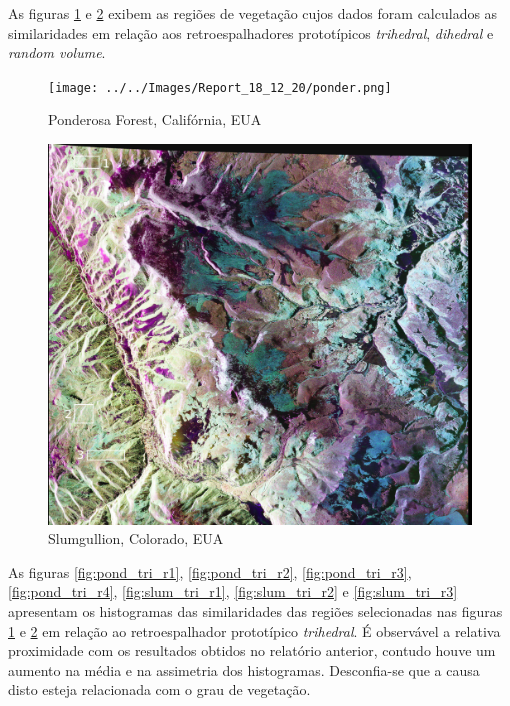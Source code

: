 \documentclass[12pt]{article}
\begin{document}
As figuras \ref{fig:pond} e \ref{fig:slum} exibem as regiões de vegetação cujos dados foram calculados as similaridades em relação aos retroespalhadores prototípicos \textit{trihedral}, \textit{dihedral} e \textit{random volume}.
\newpage

\begin{figure}[!h]
    \centering
    \texttt{[image: ../../Images/Report\_18\_12\_20/ponder.png]}
    \caption{Ponderosa Forest, Califórnia, EUA}
    \label{fig:pond}
\end{figure}

\begin{figure}[!h]
    \centering
    \includegraphics[width = 0.9\linewidth]{../../Images/Report_18_12_20/slum.png}
    \caption{Slumgullion, Colorado, EUA}
    \label{fig:slum}
\end{figure}

As figuras \ref{fig:pond_tri_r1}, \ref{fig:pond_tri_r2}, \ref{fig:pond_tri_r3}, \ref{fig:pond_tri_r4}, \ref{fig:slum_tri_r1}, \ref{fig:slum_tri_r2} e \ref{fig:slum_tri_r3} apresentam os histogramas das similaridades das regiões selecionadas nas figuras \ref{fig:pond} e \ref{fig:slum} em relação ao retroespalhador prototípico \textit{trihedral}. É observável a relativa proximidade com os resultados obtidos no relatório anterior, contudo houve um aumento na média e na assimetria dos histogramas. Desconfia-se que a causa disto esteja relacionada com o grau de vegetação.
\end{document}
